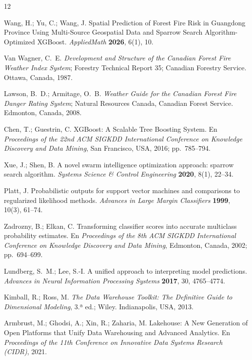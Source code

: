 \documentclass[11pt,a4paper]{article}
\begin{document}
\begin{thebibliography}{12}\small

Wang, H.; Yu, C.; Wang, J.
Spatial Prediction of Forest Fire Risk in Guangdong Province Using
Multi-Source Geospatial Data and Sparrow Search Algorithm-Optimized
XGBoost. \emph{AppliedMath} \textbf{2026}, 6(1), 10.

Van Wagner, C.~E.
\emph{Development and Structure of the Canadian Forest Fire Weather Index
System}; Forestry Technical Report 35; Canadian Forestry Service. Ottawa,
Canada, 1987.

Lawson, B.~D.; Armitage, O.~B.
\emph{Weather Guide for the Canadian Forest Fire Danger Rating System};
Natural Resources Canada, Canadian Forest Service. Edmonton, Canada, 2008.

Chen, T.; Guestrin, C.
XGBoost: A Scalable Tree Boosting System. En \emph{Proceedings of the 22nd
ACM SIGKDD International Conference on Knowledge Discovery and Data
Mining}, San Francisco, USA, 2016; pp.~785--794.

Xue, J.; Shen, B.
A novel swarm intelligence optimization approach: sparrow search algorithm.
\emph{Systems Science \& Control Engineering} \textbf{2020}, 8(1), 22--34.

Platt, J.
Probabilistic outputs for support vector machines and comparisons to
regularized likelihood methods. \emph{Advances in Large Margin Classifiers}
\textbf{1999}, 10(3), 61--74.

Zadrozny, B.; Elkan, C.
Transforming classifier scores into accurate multiclass probability
estimates. En \emph{Proceedings of the 8th ACM SIGKDD International
Conference on Knowledge Discovery and Data Mining}, Edmonton, Canada, 2002;
pp.~694--699.

Lundberg, S.~M.; Lee, S.-I.
A unified approach to interpreting model predictions.
\emph{Advances in Neural Information Processing Systems} \textbf{2017},
30, 4765--4774.

Kimball, R.; Ross, M.
\emph{The Data Warehouse Toolkit: The Definitive Guide to Dimensional
Modeling}, 3.ª ed.; Wiley. Indianapolis, USA, 2013.

Armbrust, M.; Ghodsi, A.; Xin, R.; Zaharia, M.
Lakehouse: A New Generation of Open Platforms that Unify Data Warehousing
and Advanced Analytics. En \emph{Proceedings of the 11th Conference on
Innovative Data Systems Research (CIDR)}, 2021.


\end{thebibliography}
\end{document}
